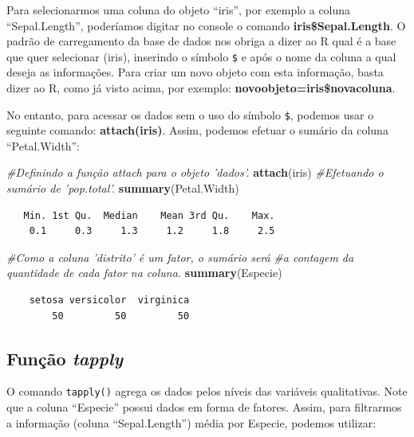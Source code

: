 \documentclass[12pt,portuguese,oneside]{book}
\newenvironment{Shaded}{\begin{snugshade}}{\end{snugshade}}
\newcommand{\KeywordTok}[1]{\textcolor[rgb]{0.13,0.29,0.53}{\textbf{#1}}}
\newcommand{\CommentTok}[1]{\textcolor[rgb]{0.56,0.35,0.01}{\textit{#1}}}
\newcommand{\NormalTok}[1]{#1}
\begin{document}
Para selecionarmos uma coluna do objeto ``iris'', por exemplo a coluna
``Sepal.Length'', poderíamos digitar no console o comando
\textbf{iris\$Sepal.Length}. O padrão de carregamento da base de dados
nos obriga a dizer ao R qual é a base que quer selecionar (iris),
inserindo o símbolo \texttt{\$} e após o nome da coluna a qual deseja as
informações. Para criar um novo objeto com esta informação, basta dizer
ao R, como já visto acima, por exemplo:
\textbf{novoobjeto=iris\$novacoluna}.

No entanto, para acessar os dados sem o uso do símbolo \texttt{\$},
podemos usar o seguinte comando: \textbf{attach(iris)}. Assim, podemos
efetuar o sumário da coluna ``Petal.Width'':

\begin{Shaded}
\begin{Highlighting}[]
\CommentTok{#Definindo a função attach para o objeto 'dados'.}
\KeywordTok{attach}\NormalTok{(iris)}
\CommentTok{#Efetuando o sumário de 'pop.total'.}
\KeywordTok{summary}\NormalTok{(Petal.Width)}
\end{Highlighting}
\end{Shaded}

\begin{verbatim}
   Min. 1st Qu.  Median    Mean 3rd Qu.    Max. 
    0.1     0.3     1.3     1.2     1.8     2.5 
\end{verbatim}

\begin{Shaded}
\begin{Highlighting}[]
\CommentTok{#Como a coluna 'distrito' é um fator, o sumário será }
\CommentTok{#a contagem da quantidade de cada fator na coluna.}
\KeywordTok{summary}\NormalTok{(Especie)}
\end{Highlighting}
\end{Shaded}

\begin{verbatim}
    setosa versicolor  virginica 
        50         50         50 
\end{verbatim}

\subsection{\texorpdfstring{Função
\emph{tapply}}{Função tapply}}\label{funcao-tapply}

O comando \texttt{tapply()} agrega os dados pelos níveis das variáveis
qualitativas. Note que a coluna ``Especie'' possui dados em forma de
fatores. Assim, para filtrarmos a informação (coluna ``Sepal.Length'')
média por Especie, podemos utilizar:
\end{document}
